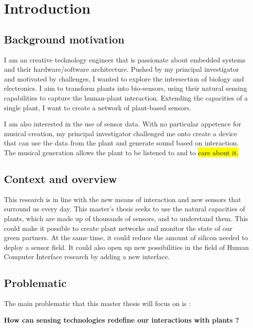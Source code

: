 \section{Introduction}

\subsection{Background motivation}

I am an creative technology engineer that is passionate about embedded systems and 
their hardware/software architecture.
Pushed by my principal investigator and motivated by challenges, I wanted to 
explore the intersection of biology and electronics. 
I aim to transform plants into bio-sensors, using their natural sensing capabilities to 
capture the human-plant interaction. Extending the capacities of a single plant, I want to create a network of 
plant-based sensors. 

I am also interested in the use of sensor data. With no particular appetence for musical creation, 
my principal investigator challenged me onto create a device that can use the data from the plant 
and generate sound based on interaction. The musical generation allows the plant to be listened to and to \hl{care
about it.}

\subsection{Context and overview}

This research is in line with the new means of interaction and new sensors that surround us every day.
This master's thesis seeks to use the natural capacities of plants, which are made up of thousands of sensors, and to understand them.
This could make it possible to create plant networks and monitor the state of our green partners. 
At the same time, it could reduce the amount of silicon needed to deploy a sensor field.
It could also open up new possibilities in the field of Human Computer Interface research by adding a new interface.


\subsection{Problematic}

The main problematic that this master thesis will focus on is :

\begin{center}
    \textbf{How can sensing technologies redefine our interactions with plants ?}\\
\end{center}

